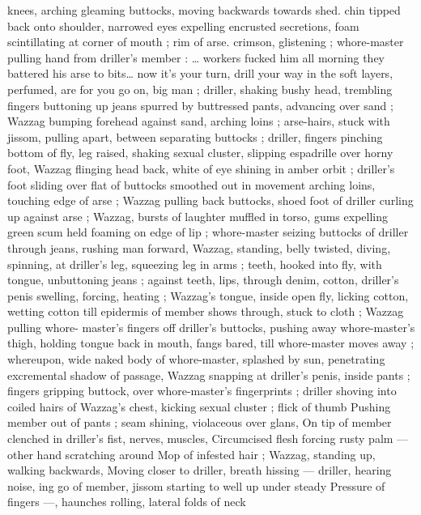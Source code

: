 knees, arching gleaming buttocks, moving backwards towards shed. 
chin tipped back onto shoulder, narrowed eyes expelling encrusted 
secretions, foam scintillating at corner of mouth ; rim of arse. 
crimson, glistening ; whore-master pulling hand from driller's 
member : {\td} {\gl} {\ldots} workers fucked him all morning{\td} they battered his 
arse to bits{\ldots} now it's your turn, drill your way in{\td} the soft layers, 
perfumed, are for you{\td} go on, big man {\gr} ; driller, shaking bushy head, 
trembling fingers buttoning up jeans spurred by buttressed pants, 
advancing over sand ; Wazzag bumping forehead against sand, 
arching loins ; arse-hairs, stuck with jissom, pulling apart, between 
separating buttocks ; driller, fingers pinching bottom of fly, leg 
raised, shaking sexual cluster, slipping espadrille over horny foot, 
Wazzag flinging head back, white of eye shining in amber orbit ; 
driller's foot sliding over flat of buttocks smoothed out in movement 
arching loins, touching edge of arse ; Wazzag pulling back buttocks, 
shoed foot of driller curling up against arse ; Wazzag, bursts of 
laughter muffled in torso, gums expelling green scum held foaming 
on edge of lip ; whore-master seizing buttocks of driller through 
jeans, rushing man forward, Wazzag, standing, belly twisted, diving, 
spinning, at driller's leg, squeezing leg in arms ; teeth, hooked into 
fly, with tongue, unbuttoning jeans ; against teeth, lips, through 
denim, cotton, driller's penis swelling, forcing, heating ; Wazzag's 
tongue, inside open fly, licking cotton, wetting cotton till epidermis 
of member shows through, stuck to cloth ; Wazzag pulling whore- 
master's fingers off driller's buttocks, pushing away whore-master's 
thigh, holding tongue back in mouth, fangs bared, till whore-master 
moves away ; whereupon, wide naked body of whore-master, 
splashed by sun, penetrating excremental shadow of passage, 
Wazzag snapping at driller's penis, inside pants ; fingers gripping 
buttock, over whore-master's fingerprints ; driller shoving into coiled 
hairs of Wazzag's chest, kicking sexual cluster ; flick of thumb 
Pushing member out of pants ; seam shining, violaceous over glans, 
On tip of member clenched in driller's fist, nerves, muscles, 
Circumcised flesh forcing rusty palm --- other hand scratching around 
Mop of infested hair ; Wazzag, standing up, walking backwards, 
Moving closer to driller, breath hissing --- driller, hearing noise, 
ing go of member, jissom starting to well up under steady 
Pressure of fingers ---, haunches rolling, lateral folds of neck 
